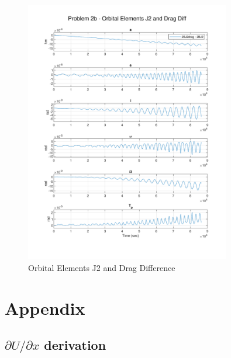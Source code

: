 \documentclass[conf]{new-aiaa}
\begin{document}
\begin{figure}[H]
	\centering 
	\includegraphics[width=0.8\textwidth]{Problem 2b - Orbital Elements J2 and Drag Diff.pdf}
	\caption{Orbital Elements J2 and Drag Difference} 
	\label{fig:orb_j2_drag}
\end{figure}



\newpage
\section*{Appendix} 

\subsection*{ $\partial U / \partial x$ derivation}
\end{document}
